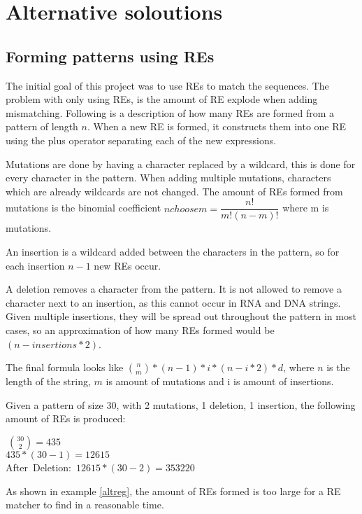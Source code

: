 \section{Alternative soloutions}
\subsection{Forming patterns using REs}
The initial goal of this project was to use REs to match the sequences. The problem with only using REs, is the amount of RE explode when adding mismatching. Following is a description of how many REs are formed from a pattern of length $n$. When a new RE is formed, it constructs them into one RE using the plus operator separating each of the new expressions. 

Mutations are done by having a character replaced by a wildcard, this is done for every character in the pattern. When adding multiple mutations, characters which are already wildcards are not changed. The amount of REs formed from mutations is the binomial coefficient ${n choose m}=\dfrac{n!}{m!(n-m)!}$ where m is mutations.

An insertion is a wildcard added between the characters in the pattern, so for each insertion $n-1$ new REs occur. 

A deletion removes a character from the pattern. It is not allowed to remove a character next to an insertion, as this cannot occur in RNA and DNA strings. Given multiple insertions, they will be spread out throughout the pattern in most cases, so an approximation of how many REs formed would be $(n - insertions * 2)$.

The final formula looks like ${n \choose m}*(n-1)*i*(n-i*2)*d$, where $n$ is the length of the string, $m$ is amount of mutations and i is amount of insertions.

\begin{myex}\label{altreg}
Given a pattern of size 30, with 2 mutations, 1 deletion, 1 insertion, the following amount of REs is produced: \\
\begin{center}
 $~{30 \choose 2} = 435$\\
 $435 * (30-1) = 12615$\\
After~Deletion:~$12615*(30-2) = 353220$
\end{center}
\end{myex}

As shown in example \ref{altreg}, the amount of REs formed is too large for a RE matcher to find in a reasonable time. 


